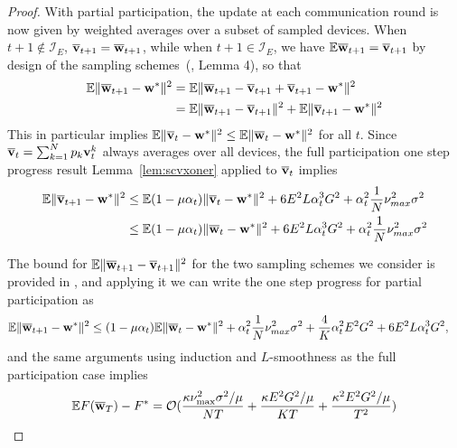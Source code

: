 \begin{proof}
	With partial participation, the update at each communication round
	is now given by weighted averages over a subset of sampled devices. When $t+1\notin\mathcal{I}_{E}$,
	${\overline{\mathbf{v}}}_{t+1}={\overline{\mathbf{w}}}_{t+1}$, while when $t+1\in\mathcal{I}_{E}$,
	we have $\mathbb{E}{\overline{\mathbf{w}}}_{t+1}={\overline{\mathbf{v}}}_{t+1}$ by design
	of the sampling schemes~(\cite{li2019convergence}, Lemma 4), so that 
	\begin{align*}
	\mathbb{E}\|{\overline{\mathbf{w}}}_{t+1}-{\mathbf{w}}^{\ast}\|^{2} & =\mathbb{E}\|{\overline{\mathbf{w}}}_{t+1}-{\overline{\mathbf{v}}}_{t+1}+{\overline{\mathbf{v}}}_{t+1}-{\mathbf{w}}^{\ast}\|^{2}\\
	& =\mathbb{E}\|{\overline{\mathbf{w}}}_{t+1}-{\overline{\mathbf{v}}}_{t+1}\|^{2}+\mathbb{E}\|{\overline{\mathbf{v}}}_{t+1}-{\mathbf{w}}^{\ast}\|^{2}
	\end{align*}
	This in particular implies $\mathbb{E}\|{\overline{\mathbf{v}}}_{t}-{\mathbf{w}}^{\ast}\|^{2}\leq \mathbb{E}\|{\overline{\mathbf{w}}}_{t}-{\mathbf{w}}^{\ast}\|^{2}$ for all $t$.
	Since ${\overline{\mathbf{v}}}_t =\sum_{k=1}^{N} p_{k} \mathbf{v}_{t}^{k}$ always averages over all devices, the full participation one step progress result Lemma~\ref{lem:scvxoner} applied to ${\overline{\mathbf{v}}}_t$  implies
	\begin{align*}
	   \mathbb{E}\|{\overline{\mathbf{v}}}_{t+1}-{\mathbf{w}}^{\ast}\|^{2} & \leq\mathbb{E}(1-\mu\alpha_{t})\|{\overline{\mathbf{v}}}_{t}-{\mathbf{w}}^{\ast}\|^{2}+6E^{2}L\alpha_{t}^{3}G^{2}+\alpha_{t}^{2}\frac{1}{N}\nu_{max}^{2}\sigma^{2}\\ &
	   \leq\mathbb{E}(1-\mu\alpha_{t})\|{\overline{\mathbf{w}}}_{t}-{\mathbf{w}}^{\ast}\|^{2}+6E^{2}L\alpha_{t}^{3}G^{2}+\alpha_{t}^{2}\frac{1}{N}\nu_{max}^{2}\sigma^{2}
	\end{align*}
	
	The bound for $\mathbb{E}\|{\overline{\mathbf{w}}}_{t+1}-{\overline{\mathbf{v}}}_{t+1}\|^{2}$ for the two sampling schemes we consider is provided in \eq{\ref{eq:partialsample}}, and applying it we can write the one step progress for partial participation as
	\begin{align}\label{eqn:scvx-partial-oner}
	\mathbb{E}\|\ov{w}_{t+1}-\vw^{\ast}\|^{2} & \leq(1-\mu\alpha_{t})\mathbb{E}\|\ov{w}_{t}-\vw^{\ast}\|^{2}+\alpha_{t}^{2}\frac{1}{N}\nu_{max}^{2}\sigma^{2}+\frac{4}{K}\alpha_{t}^{2}E^{2}G^{2}+6E^{2}L\alpha_{t}^{3}G^{2},
	\end{align}
	and the same arguments using induction and $L$-smoothness as the full participation case implies 
	\begin{align*}
	\mathbb{E}F({\overline{\mathbf{w}}}_{T})-F^{\ast}=\mathcal{O}(\frac{\kappa\nu_{\max}^{2}\sigma^{2}/\mu}{NT}+\frac{\kappa E^{2}G^{2}/\mu}{KT}+\frac{\kappa^{2}E^{2}G^{2}/\mu}{T^{2}})
	\end{align*}
	

\end{proof}
